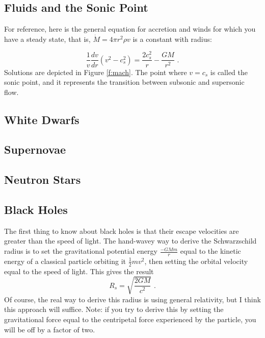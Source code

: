 \subsection{Fluids and the Sonic Point}

For reference, here is the general equation for accretion and winds for which you have a steady state, that is, $\dot{M} = 4 \pi r^2 \rho v$ is a constant with radius:

\begin{equation}
\frac{1}{v} \frac{dv}{dr} (v^2 - c_s^2) = \frac{2 c_s^2}{r} - \frac{G M}{r^2}\,\,.
\end{equation}
Solutions are depicted in Figure \ref{f:mach}. The point where $v = c_s$ is called the sonic point, and it represents the transition between subsonic and supersonic flow.

\subsection{White Dwarfs}

\subsection{Supernovae}

\subsection{Neutron Stars}

\subsection{Black Holes}

The first thing to know about black holes is that their escape velocities are greater than the speed of light. The hand-wavey way to derive the Schwarzschild radius is to set the gravitational potential energy $\frac{-G Mm}{r}$ equal to the kinetic energy of a classical particle orbiting it $\frac{1}{2}m v^2$, then setting the orbital velocity equal to the speed of light. This gives the result
\begin{equation}
R_s = \sqrt{\frac{2GM}{c^2}}\,\,.
\end{equation}
Of course, the real way to derive this radius is using general relativity, but I think this approach will suffice. Note: if you try to derive this by setting the gravitational force equal to the centripetal force experienced by the particle, you will be off by a factor of two.

